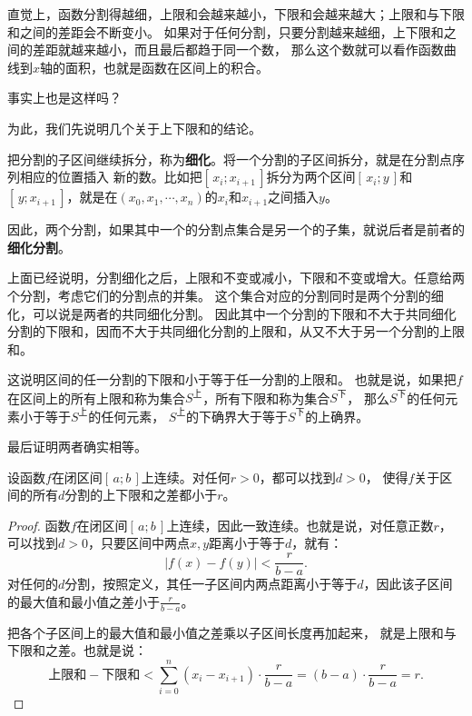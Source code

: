 \documentclass[12pt,UTF8]{ctexbook}
\begin{document}
\begin{appendix}
直觉上，函数分割得越细，上限和会越来越小，下限和会越来越大；上限和与下限和之间的差距会不断变小。
如果对于任何分割，只要分割越来越细，上下限和之间的差距就越来越小，而且最后都趋于同一个数，
那么这个数就可以看作函数曲线到$x$轴的面积，也就是函数在区间上的积合。

事实上也是这样吗？

为此，我们先说明几个关于上下限和的结论。

把分割的子区间继续拆分，称为\textbf{细化}。将一个分割的子区间拆分，就是在分割点序列相应的位置插入
新的数。比如把$[\,x_i; x_{i+1}\,]$拆分为两个区间$[\,x_i; y\,]$和$[\,y; x_{i+1}\,]$，就是在$(x_0, x_1, \cdots, x_n)$的$x_i$和$x_{i+1}$之间插入$y$。

因此，两个分割，如果其中一个的分割点集合是另一个的子集，就说后者是前者的\textbf{细化分割}。

上面已经说明，分割细化之后，上限和不变或减小，下限和不变或增大。任意给两个分割，考虑它们的分割点的并集。
这个集合对应的分割同时是两个分割的细化，可以说是两者的共同细化分割。
因此其中一个分割的下限和不大于共同细化分割的下限和，因而不大于共同细化分割的上限和，从又不大于另一个分割的上限和。

这说明区间的任一分割的下限和小于等于任一分割的上限和。
也就是说，如果把$f$在区间上的所有上限和称为集合$S^{\text{上}}$，所有下限和称为集合$S^{\text{下}}$，
那么$S^{\text{下}}$的任何元素小于等于$S^{\text{上}}$的任何元素，
$S^{\text{上}}$的下确界大于等于$S^{\text{下}}$的上确界。

最后证明两者确实相等。

\begin{tm}\label{tm:c-1-10}
    设函数$f$在闭区间$[\,a; b\,]$上连续。对任何$r>0$，都可以找到$d>0$，
    使得$f$关于区间的所有$d$\dash 分割的上下限和之差都小于$r$。
\end{tm}

\begin{proof}
    函数$f$在闭区间$[\,a; b\,]$上连续，因此一致连续。也就是说，对任意正数$r$，
    可以找到$d>0$，只要区间中两点$x,y$距离小于等于$d$，就有：
    $$ |f(x) - f(y)| < \frac{r}{b - a}. $$
    对任何的$d$\dash 分割，按照定义，其任一子区间内两点距离小于等于$d$，因此该子区间的最大值和最小值之差小于$\frac{r}{b - a}$。
    
    把各个子区间上的最大值和最小值之差乘以子区间长度再加起来，
    就是上限和与下限和之差。也就是说：
    $$ \mbox{上限和} - \mbox{下限和} < \sum_{i=0}^n (x_i - x_{i+1}) \cdot \frac{r}{b - a} = (b - a) \cdot \frac{r}{b - a} = r.$$
\end{proof}


\end{appendix}
\end{document}
